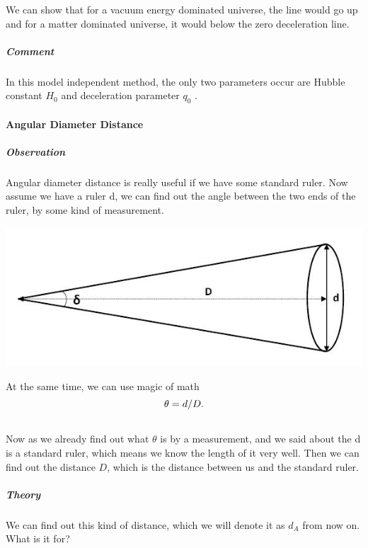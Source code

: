 \documentclass[letterpaper,10pt,english]{sphinxmanual}
\begin{document}
{We can show that for a vacuum energy dominated universe, the line would go up and for a matter dominated universe, it would below the zero deceleration line.


\subparagraph{Comment}
\label{Cosmology/cosmoIndex:comment}
In this model independent method, the only two parameters occur are Hubble constant $H_0$ and deceleration parameter $q_0$ .


\paragraph{Angular Diameter Distance}
\label{Cosmology/cosmoIndex:angular-diameter-distance}

\subparagraph{Observation}
\label{Cosmology/cosmoIndex:observation}
Angular diameter distance is really useful if we have some standard ruler. Now assume we have a ruler d, we can find out the angle between the two ends of the ruler, by some kind of measurement.

\includegraphics{AngularDiaFormula.jpg}

At the same time, we can use magic of math
\begin{gather}
\begin{split}\theta = d/D .\end{split}\notag\\\begin{split}\end{split}\notag
\end{gather}
Now as we already find out what $\theta$ is by a measurement, and we said about the d is a standard ruler, which means we know the length of it very well. Then we can find out the distance $D$, which is the distance between us and the standard ruler.


\subparagraph{Theory}
\label{Cosmology/cosmoIndex:theory}
We can find out this kind of distance, which we will denote it as $d_A$ from now on. What is it for?

}
\end{document}
